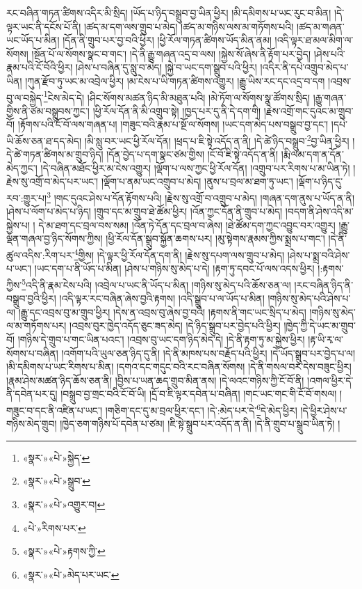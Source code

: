རང་བཞིན་གཏན་ཚིགས་འདིར་མི་སྲིད། །ཡོད་པ་ཉིད་བསྒྲུབ་བྱ་ཡིན་ཕྱིར། །མི་དམིགས་པ་ཡང་རུང་བ་མིན། །དེ་ལྟར་ཡང་ནི་དངོས་པོ་ནི། །ཚད་མ་དག་ལས་གྲུབ་པ་མེད། །ཚད་མ་གཉིས་ལས་མ་གཏོགས་པའི། །ཚད་མ་གཞན་ཡང་ཡོད་པ་མིན། །དོན་ནི་གྲུབ་པར་བྱ་བའི་ཕྱིར། །ཕྱི་རོལ་གཏན་ཚིགས་ཡོད་མིན་ནམ། །འདི་ལྟར་ཐ་མལ་མིག་ལ་སོགས། །སྔོན་པོ་ལ་སོགས་སྣང་བ་གང་། །དེ་ནི་རྒྱུ་གཞན་འདྲ་བ་ལས། །སྐྱེས་སོ་ཞེས་ནི་རྟོག་པར་བྱེད། །ཤེས་པའི་རྣམ་པའི་ངོ་བོའི་ཕྱིར། །ཤེས་པ་བཞིན་དུ་སླུ་བ་མེད། །སྐྱེ་བ་ཡང་དག་སྒྲུབ་པའི་ཕྱིར། །འདིར་ནི་དཔེ་འགྲུབ་མེད་པ་ཡིན། །ཀུན་རྫོབ་ཏུ་ཡང་མ་འབྲེལ་ཕྱིར། །མ་ངེས་པ་ཡི་གཏན་ཚིགས་འགྱུར། །རྒྱུ་ཡིས་རང་དང་འདྲ་བ་དག །འབྲས་བུ་ལ་བསྐྱེད་\footnote{«སྣར་»«པེ་»སྐྱེད་}ངེས་མེད་དེ། །ཤིང་སོགས་མཚན་ཉིད་མི་མཐུན་པའི། །མེ་ཏོག་ལ་སོགས་སྣ་ཚོགས་སྲིད། །རྒྱུ་གཞན་གྱིས་ནི་ཙམ་བསྒྲུབས་ཀྱང་། །ཕྱི་རོལ་དོན་ནི་མི་འགྲུབ་སྟེ། །ཁྱད་པར་དུ་ནི་དེ་དག་གི། །རྗེས་འགྲོ་གང་དུའང་མ་གྲུབ་བོ། །རྟོགས་པའི་ངོ་བོ་ལས་གཞན་པ། །གཟུང་བའི་རྣམ་པ་སྔོ་ལ་སོགས། །ཡང་དག་མེད་པས་བསྒྲུབ་བྱ་དང་། །དཔེ་ཡི་ཆོས་ཅན་ཐ་དད་མེད། །མི་སླུ་བར་ཡང་ཕྱི་རོལ་དོན། །ཕྲད་པ་ཇི་སྟེ་འདོད་ན་ནི། །དེ་ཚེ་ཉིད་བསྒྲུབ་\footnote{«སྣར་»«པེ་»སྒྲུབ་}བྱ་ཡིན་ཕྱིར། །དེ་ཚེ་གཏན་ཚིགས་མ་གྲུབ་ཉིད། །དོན་བྱེད་པ་དག་སྣང་ཙམ་གྱིས། །ངོ་བོ་ཇི་སྟེ་འདོད་ན་ནི། །རྨི་ལམ་དག་ན་དོན་མེད་ཀྱང་། །དེ་བཞིན་མཐོང་ཕྱིར་མ་ངེས་འགྱུར། །ལྡོག་པ་ལས་ཀྱང་ཕྱི་རོལ་དོན། །འགྲུབ་པར་རིགས་པ་མ་ཡིན་ཏེ། །རྗེས་སུ་འགྲོ་བ་མེད་པར་ཡང་། །ལྡོག་པ་ནམ་ཡང་འགྲུབ་པ་མེད། །ནུས་པ་བྲལ་མ་ཐག་ཏུ་ཡང་། །ལྡོག་པ་ཉིད་དུ་རབ་:གྱུར་པ།\footnote{«སྣར་»«པེ་»འགྱུར་བ།} །གང་དུའང་ཤེས་པ་དོན་རྟོགས་པའི། །རྗེས་སུ་འགྲོ་བ་འགྲུབ་པ་མེད། །གཞན་དག་ནུས་པ་ཡོད་ན་ནི། །ཤེས་པ་ལོག་པ་མེད་པ་ཉིད། །གྲུབ་དང་མ་གྲུབ་ཐེ་ཚོམ་ཕྱིར། །འོན་ཀྱང་དོན་ནི་གྲུབ་པ་མེད། །བདག་ནི་ཤེས་འདི་མ་སྐྱེས་པ། །
དེ་མ་ཐག་དང་བྲལ་བས་སམ། །འོན་ཏེ་དོན་དང་བྲལ་བ་ཞེས། །ཐེ་ཚོམ་དག་ཀྱང་འབྱུང་བར་འགྱུར། །རྒྱུ་ལྡན་གཞལ་བྱ་ཉིད་སོགས་ཀྱིས། །ཕྱི་རོལ་དོན་སྒྲུབ་སྐྱོན་ཆགས་པར། །མུ་སྟེགས་རྣམས་ཀྱིས་སྨྲས་པ་གང་། །དེ་ནི་ཚུལ་འདིས་:རིག་པར་\footnote{«པེ་»རིགས་པར་}གྱིས། །དེ་ལྟར་ཕྱི་རོལ་དོན་དག་ནི། །རྗེས་སུ་དཔག་ལས་གྲུབ་པ་མེད། །ཤེས་པ་སྨྲ་བའི་ཤེས་པ་ཡང་། །ཡང་དག་པ་ནི་ཡོད་པ་མིན། །ཤེས་པ་གཉིས་སུ་མེད་པ་དེ། །རྟག་ཏུ་དབང་པོ་ལས་འདས་ཕྱིར། །:རྟགས་ཀྱིས་\footnote{«སྣར་»«པེ་»རྟགས་ཀྱི་}འདི་ནི་རྣམ་ངེས་པའི། །འབྲེལ་པ་ཡང་ནི་ཡོད་པ་མིན། །གཉིས་སུ་མེད་པའི་ཆོས་ཅན་ལ། །རང་བཞིན་ཉིད་ནི་བསྒྲུབ་བྱའི་ཕྱིར། །འདི་ལྟར་རང་བཞིན་ཞེས་བྱའི་རྟགས། །འདི་སྒྲུབ་པ་ལ་ཡོད་པ་མིན། །གཉིས་སུ་མེད་པའི་ཤེས་པ་ལ། །རྒྱུ་དང་འབྲས་བུ་མ་གྲུབ་ཕྱིར། །དེས་ན་འབྲས་བུ་ཞེས་བྱ་བའི། །རྟགས་ནི་གང་ཡང་སྲིད་པ་མེད། །གཉིས་སུ་མེད་ལ་མ་གཏོགས་པར། །འབྲས་བུར་ཁྱེད་འདོད་ཅུང་ཟད་མེད། །དེ་ཉིད་སྒྲུབ་པར་བྱེད་པའི་ཕྱིར། །ཁྱེད་ཀྱི་དེ་ཡང་མ་གྲུབ་བོ། །གཉིས་དེ་གྲུབ་པ་གང་ཡིན་པའང་། །འབྲས་བུ་ཡང་དག་ཉིད་མེད་དེ། །དེ་ནི་རྟག་ཏུ་མ་སྐྱེས་ཕྱིར། །རྟ་ཡི་རྭ་ལ་སོགས་པ་བཞིན། །འགོག་པའི་ཡུལ་ཅན་ཉིད་དུ་ནི། །དེ་ནི་མཁས་པས་བརྗོད་པའི་ཕྱིར། །དེ་ཡོད་སྒྲུབ་པར་བྱེད་པ་ལ། །མི་དམིགས་པ་ཡང་རིགས་པ་མིན། །དགའ་དང་གདུང་བའི་རང་བཞིན་སོགས། །དེ་ནི་གསལ་བར་དེས་བཟུང་ཕྱིར། །རྣམ་ཤེས་མཚན་ཉིད་ཆོས་ཅན་ནི། །བྱིས་པ་ཡན་ཆད་གྲུབ་མིན་ནས། །དེ་ལའང་གཉིས་ཀྱི་ངོ་བོ་ནི། །འགལ་ཕྱིར་དེ་ནི་དབེན་པར་དུ། །བསྒྲུབ་བྱ་གྲང་བའི་ངོ་བོ་ཡི། །དྲོ་བ་ཇི་ལྟར་དབེན་པ་བཞིན། །གང་ཡང་གང་གི་ངོ་བོ་གསལ། །གཟུང་བ་དང་ནི་འཛིན་པ་ཡང་། །གཅིག་དང་དུ་མ་བྲལ་ཕྱིར་དང་། །དེ་:མེད་པར་དེ་\footnote{«སྣར་»«པེ་»མེད་པར་ཡང་}དེ་མེད་ཕྱིར། །དེ་ཕྱིར་ཤེས་པ་གཉིས་མེད་གྲུབ། །ཁྱེད་ཅག་གཉིས་པོ་དབེན་པ་ཙམ། །ཇི་སྟེ་སྒྲུབ་པར་འདོད་ན་ནི། །དེ་ནི་གྲུབ་པ་སྒྲུབ་ཡིན་ཏེ། །
